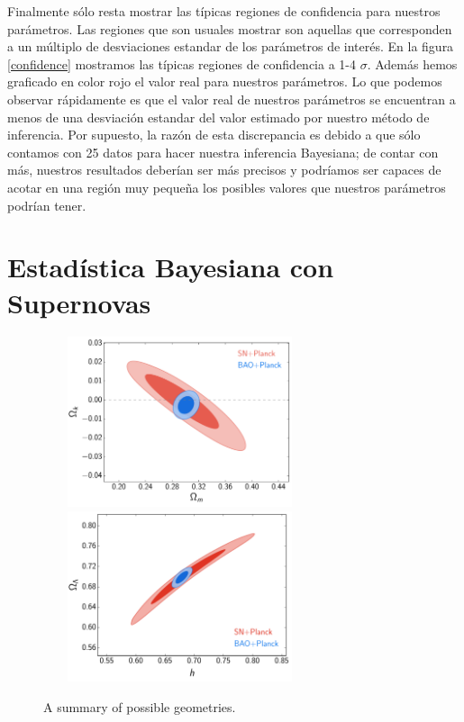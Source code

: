 \documentclass[10.5pt,prb,
               showpacs,            %
               preprintnumbers,     %
               aps,                 %
               prl,          	    %
               letterpaper,             %
               superscriptaddress,      %
               nofootinbib,         %
               tightenlines,        %
               floats,floatfix      %
               ,usenatbib]{revtex4-1}%
\begin{document}
Finalmente s\'olo resta mostrar las t\'ipicas regiones de confidencia para nuestros par\'ametros. Las regiones que son usuales mostrar son aquellas que corresponden a un m\'ultiplo de desviaciones estandar de los par\'ametros de inter\'es. En la figura \ref{confidence} mostramos las t\'ipicas regiones de confidencia a 1-4 $\sigma$. Adem\'as hemos graficado en color rojo el valor real para nuestros par\'ametros. Lo que podemos observar r\'apidamente es que el valor real de nuestros par\'ametros se encuentran a menos de una desviaci\'on estandar del valor estimado por nuestro m\'etodo de inferencia. Por supuesto, la raz\'on de esta discrepancia es debido a que s\'olo contamos con 25 datos para hacer nuestra inferencia Bayesiana; de contar con m\'as, nuestros resultados deber\'ian ser m\'as precisos y podr\'iamos ser capaces de acotar en una regi\'on muy peque\~na los posibles valores que nuestros par\'ametros podr\'ian tener.  


\section{Estad\'istica Bayesiana con Supernovas}



\begin{figure}[h]
\begin{center}
\includegraphics[trim =  0mm  0mm 0mm 0mm, clip, width=8cm, height=5cm]{constraints.pdf} 
\includegraphics[trim =  0mm  0mm 0mm 0mm, clip, width=8cm, height=5cm]{constraints_1.pdf} 
\end{center}
\caption[Geometries of the spacetime]
{A summary of possible geometries.}
\label{Fig:cmb_sh}
\end{figure}
\end{document}
